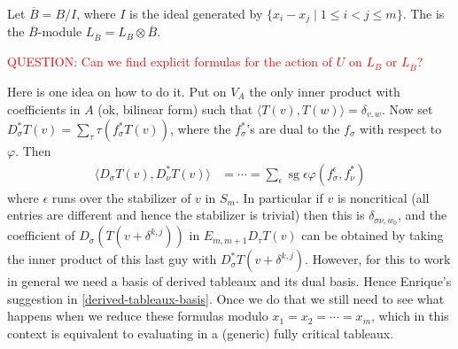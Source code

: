\documentclass[11pt,fleqn]{article}
\newcommand\ot{\otimes}
\renewcommand\phi{\varphi}
\DeclareMathOperator\sg{sg}
\begin{document}
\begin{Definition}
Let $\overline B = B/I$, where $I$ is the ideal generated by $\{x_i - x_j \mid 
1 \leq i < j \leq m\}$. The  is the
$\overline B$-module $L_{\overline B} = L_B \ot \overline B$.
\end{Definition}

\textcolor{red}{QUESTION: Can we find explicit formulas for the action of $U$ 
on $L_B$ or $L_{\overline B}$?}

Here is one idea on how to do it. Put on $V_A$ the only inner product with 
coefficients in $A$ (ok, bilinear form) such that $\langle T(v), T(w) \rangle
= \delta_{v,w}$. Now set $D^*_\sigma T(v) = \sum_\tau \tau(f_\sigma^* T(v))$, 
where the $f_\sigma^*$'s are dual to the $f_\sigma$ with respect to $\phi$. 
Then
\begin{align*}
\langle D_\sigma T(v), D^*_\nu T(v)\rangle
	&= \cdots
	= \sum_{\epsilon}\sg \epsilon \phi(f_\sigma^\epsilon, f^*_\nu)
\end{align*}
where $\epsilon$ runs over the stabilizer of $v$ in $S_m$. In particular if $v$
is noncritical (all entries are different and hence the stabilizer is trivial) 
then this is $\delta_{\sigma\nu, w_0}$, and the coefficient of $D_\sigma(T(v + 
\delta^{k,j}))$ in $E_{m,m+1} D_\tau T(v)$ can be obtained by taking the inner
product of this last guy with $D^*_\sigma T(v + \delta^{k,j})$. However, for 
this to work in general we need a basis of derived tableaux and its dual basis.
Hence Enrique's suggestion in \ref{derived-tableaux-basis}. Once we do that
we still need to see what happens when we reduce these formulas modulo $x_1 = 
x_2 = \cdots = x_m$, which in this context is equivalent to evaluating in a 
(generic) fully critical tableaux.
\end{document}
